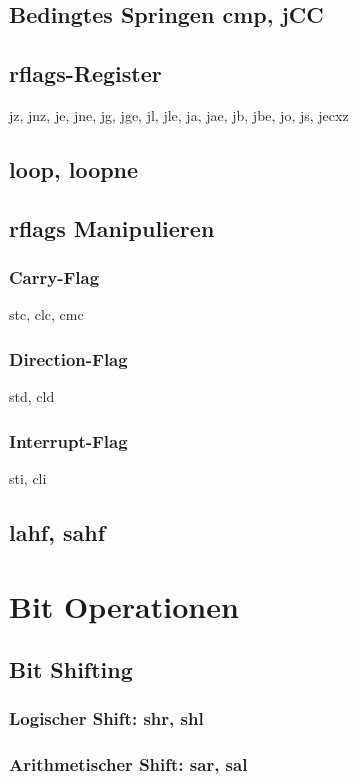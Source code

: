 \documentclass[12pt, a4paper, utf8]{book}
\begin{document}
\section{Bedingtes Springen cmp, jCC}
\section{rflags-Register}
    jz, jnz, je, jne, jg, jge, jl, jle, ja, jae, jb, jbe, jo, js, jecxz
\section{loop, loopne}
\section{rflags Manipulieren}
\subsection{Carry-Flag}
    stc, clc, cmc
\subsection{Direction-Flag}
    std, cld
\subsection{Interrupt-Flag}
    sti, cli
\section{lahf, sahf}
\chapter{Bit Operationen}
\section{Bit Shifting}
\subsection{Logischer Shift: shr, shl}
\subsection{Arithmetischer Shift: sar, sal}
\end{document}
